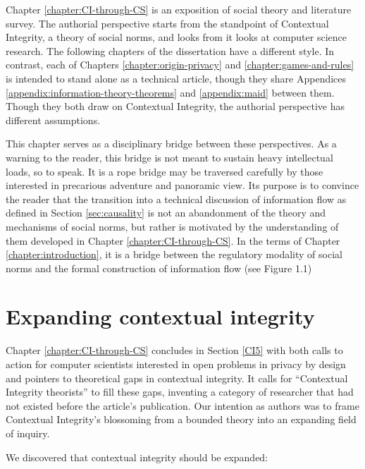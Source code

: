\documentclass[../thesis.tex]{subfiles}
\begin{document}
 Chapter \ref{chapter:CI-through-CS} is an exposition of social theory and literature survey.
 The authorial perspective starts from the standpoint of
 Contextual Integrity, a theory of social norms,
 and looks from
 it looks at computer science research.
 The following chapters of the dissertation have
 a different style.
 In contrast, each of Chapters \ref{chapter:origin-privacy} and
 \ref{chapter:games-and-rules} is intended to stand alone as a
 technical article, though they share Appendices
 \ref{appendix:information-theory-theorems}
 and \ref{appendix:maid} between them.
 Though they both draw on Contextual Integrity, the authorial perspective has different assumptions.

 This chapter serves as a disciplinary bridge between these perspectives.
 As a warning to the reader, this bridge is not meant to sustain heavy intellectual loads, so to speak.
 It is a rope bridge may be traversed carefully by those interested in precarious adventure and panoramic view.
 Its purpose is to convince the reader that the transition
 into a technical discussion of information flow as defined
 in Section \ref{sec:causality} is not an abandonment of
 the theory and mechanisms of social norms, but rather is
 motivated by the understanding of them developed in
 Chapter \ref{chapter:CI-through-CS}.
 In the terms of Chapter \ref{chapter:introduction}, it
 is a bridge between the regulatory modality of social norms
 and the formal construction of information flow (see Figure 1.1)

\section{Expanding contextual integrity}

Chapter \ref{chapter:CI-through-CS} concludes in Section \ref{CI5} with both calls to action for computer scientists interested in open problems in privacy by design and pointers to theoretical gaps in contextual integrity.
 It calls for ``Contextual Integrity theorists'' to fill these gaps, inventing a category of researcher that had not existed before the article's publication.
 Our intention as authors was to frame Contextual Integrity's blossoming from a bounded theory into an expanding field of inquiry.
 
 We discovered that contextual integrity should be expanded:
\end{document}
